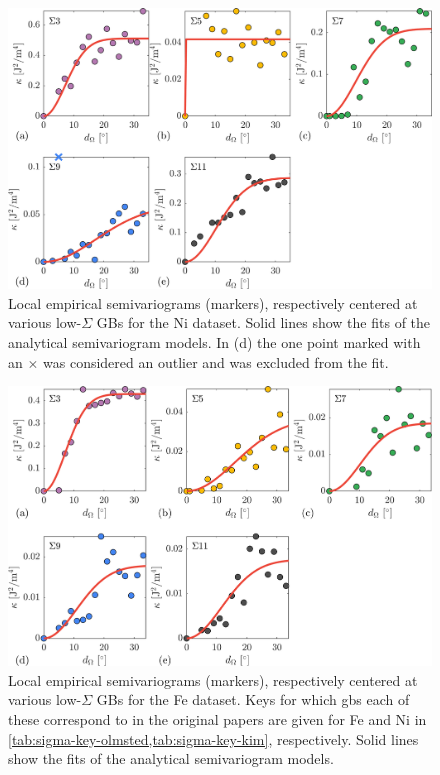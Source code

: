 \documentclass[preprint,12pt]{elsarticle}
\begin{document}
    \begin{figure}
        \centering
        \includegraphics[scale=1]{figures/LocalCorrelationLengthVariogramsOlmsted.png}
        \caption{Local empirical semivariograms (markers), respectively centered at various low-$\Sigma$ GBs for the Ni dataset. Solid lines show the fits of the analytical semivariogram models. In (d) the one point marked with an $\times$ was considered an outlier and was excluded from the fit.}
        \label{fig:localvariogramsolmsted}
    \end{figure}
    \begin{figure}
        \centering
        \includegraphics[scale=1]{figures/LocalCorrelationLengthVariogramsKim.png}
        \caption{Local empirical semivariograms (markers), respectively centered at various low-$\Sigma$ GBs for the Fe dataset. Keys for which \glspl{gb} each of these correspond to in the original papers are given for Fe and Ni in \cref{tab:sigma-key-olmsted,tab:sigma-key-kim}, respectively. Solid lines show the fits of the analytical semivariogram models.}
        \label{fig:localvariogramskim}
    \end{figure}
\end{document}
